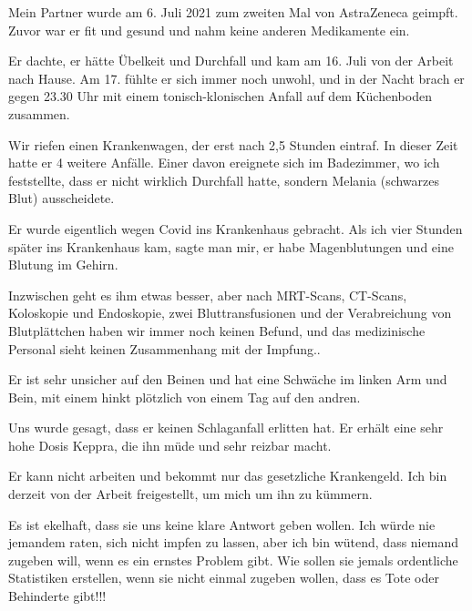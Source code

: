 

Mein Partner wurde am 6. Juli 2021 zum zweiten Mal von AstraZeneca geimpft. Zuvor war er fit und gesund und nahm keine anderen Medikamente ein.

Er dachte, er hätte Übelkeit und Durchfall und kam am 16. Juli von der Arbeit nach Hause. Am 17. fühlte er sich immer noch unwohl, und in der Nacht brach er gegen 23.30 Uhr mit einem tonisch-klonischen Anfall auf dem Küchenboden zusammen.

Wir riefen einen Krankenwagen, der erst nach 2,5 Stunden eintraf. In dieser Zeit hatte er 4 weitere Anfälle. Einer davon ereignete sich im Badezimmer, wo ich feststellte, dass er nicht wirklich Durchfall hatte, sondern Melania (schwarzes Blut) ausscheidete.

Er wurde eigentlich wegen Covid ins Krankenhaus gebracht. Als ich vier Stunden später ins Krankenhaus kam, sagte man mir, er habe Magenblutungen und eine Blutung im Gehirn.

Inzwischen geht es ihm etwas besser, aber nach MRT-Scans, CT-Scans, Koloskopie und Endoskopie, zwei Bluttransfusionen und der Verabreichung von Blutplättchen haben wir immer noch keinen Befund, und das medizinische Personal sieht keinen Zusammenhang mit der Impfung..

Er ist sehr unsicher auf den Beinen und hat eine Schwäche im linken Arm und Bein, mit einem hinkt plötzlich von einem Tag auf den andren.

Uns wurde gesagt, dass er keinen Schlaganfall erlitten hat. Er erhält eine sehr hohe Dosis Keppra, die ihn müde und sehr reizbar macht.

Er kann nicht arbeiten und bekommt nur das gesetzliche Krankengeld. Ich bin derzeit von der Arbeit freigestellt, um mich um ihn zu kümmern.

Es ist ekelhaft, dass sie uns keine klare Antwort geben wollen. Ich würde nie jemandem raten, sich nicht impfen zu lassen, aber ich bin wütend, dass niemand zugeben will, wenn es ein ernstes Problem gibt. Wie sollen sie jemals ordentliche Statistiken erstellen, wenn sie nicht einmal zugeben wollen, dass es Tote oder Behinderte gibt!!!
